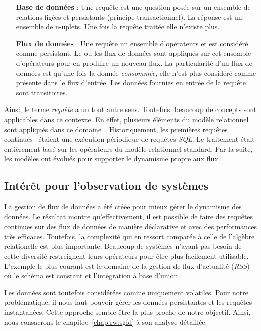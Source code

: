 \begin{itemize}
    \item[\textbf{Base de données}] : Une requête est une question posée sur un ensemble de relations figées et persistants (principe transactionnel). La réponse est un ensemble de n-uplets. Une fois la requête traitée elle n'existe plus.
    \item[\textbf{Flux de données}] : Une requête un ensemble d'opérateurs et est considéré comme persistant. Le ou les flux de données sont appliqués sur cet ensemble d'opérateurs pour en produire un nouveau flux. La particularité d'un flux de données est qu'une fois la donnée \textit{consommée}, elle n'est plus considéré comme présente dans le flux d'entrée. Les données fournies en entrée de la requête sont  transitoires.
\end{itemize}

Ainsi, le terme \textit{requête} a un tout autre sens. Toutefois, beaucoup de concepts sont applicables dans ce contexte. En effet, plusieurs éléments du modèle relationnel sont appliqués dans ce domaine~\cite{Arasu:semantic}. Historiquement, les premières requêtes continues~\cite{Terry:tapestry} étaient une exécution périodique de requêtes \textit{SQL}. Le traitement était entièrement basé sur les opérateurs du modèle relationnel standard. Par la suite, les modèles ont évolués pour supporter le dynamisme propre aux flux.

\subsection{Intérêt pour l'observation de systèmes}
La gestion de flux de données a été créée pour mieux gérer le dynamisme des données. Le résultat montre qu'effectivement, il est possible de faire des requêtes continues sur des flux de données de manière déclarative et avec des performances très efficaces. Toutefois, la complexité qui en ressort comparée à celle de l'algèbre relationelle est plus importante. Beaucoup de systèmes n'ayant pas besoin de cette diversité restreignent leurs opérateurs pour être plus facilement utilisable. L'exemple le plus courant est le domaine de la gestion de flux d'actualité (\textit{RSS}) où le schéma est constant et l'intégration à base d'union.

Les données sont toutefois considérées comme uniquement volatiles. Pour notre problématique, il nous faut pouvoir gérer les données persistantes et les requêtes instantanées. Cette approche semble être la plus proche de notre objectif. Ainsi, nous consacrons le chapitre~\ref{chap:rw:sgfd} à son analyse détaillée.

